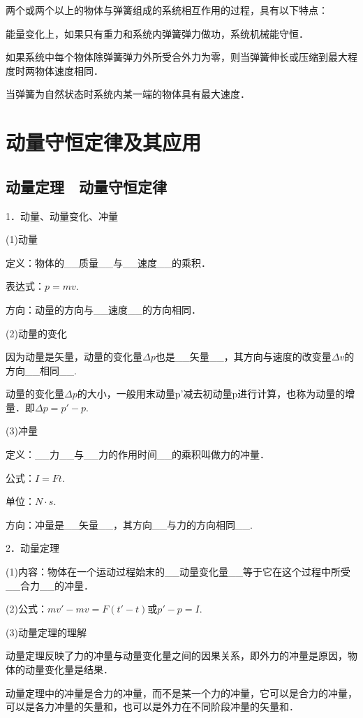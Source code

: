 \documentclass[cn,10.5pt,chinese,mac,chinesefont=founder]{elegantbook}
\begin{document}
两个或两个以上的物体与弹簧组成的系统相互作用的过程，具有以下特点：

能量变化上，如果只有重力和系统内弹簧弹力做功，系统机械能守恒．

如果系统中每个物体除弹簧弹力外所受合外力为零，则当弹簧伸长或压缩到最大程度时两物体速度相同．

当弹簧为自然状态时系统内某一端的物体具有最大速度．

\chapter{动量守恒定律及其应用}
\section{动量定理　动量守恒定律}


1．动量、动量变化、冲量

(1)动量

定义：物体的\_\_质量\_\_与\_\_速度\_\_的乘积．

表达式：$p=mv$.

方向：动量的方向与\_\_速度\_\_的方向相同．

(2)动量的变化

因为动量是矢量，动量的变化量$\Delta p$也是\_\_矢量\_\_，其方向与速度的改变量$\Delta v$的方向\_\_相同\_\_.

动量的变化量$\Delta p$的大小，一般用末动量p'减去初动量p进行计算，也称为动量的增量．即$Δp=p'-p$.

(3)冲量

定义：\_\_力\_\_与\_\_力的作用时间\_\_的乘积叫做力的冲量．

公式：$I=Ft$.

单位：$N\cdot s$.

方向：冲量是\_\_矢量\_\_，其方向\_\_与力的方向相同\_\_.

2．动量定理

(1)内容：物体在一个运动过程始末的\_\_动量变化量\_\_等于它在这个过程中所受\_\_合力\_\_的冲量．

(2)公式：$mv'-mv=F(t'-t)$或$p'-p=I$.

(3)动量定理的理解

动量定理反映了力的冲量与动量变化量之间的因果关系，即外力的冲量是原因，物体的动量变化量是结果．

动量定理中的冲量是合力的冲量，而不是某一个力的冲量，它可以是合力的冲量，可以是各力冲量的矢量和，也可以是外力在不同阶段冲量的矢量和．
\end{document}

